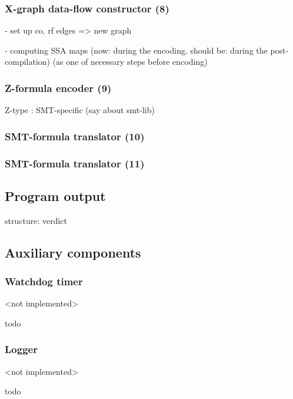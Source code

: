 \subsubsection{X-graph data-flow constructor (8)}
\label{ch:impl:proc:x-df}%

- set up co, rf edges => new graph

- computing SSA maps (now: during the encoding. should be: during the post-compilation) (as one of necessary steps before encoding)


\subsubsection{Z-formula encoder (9)}
\label{ch:impl:proc:z-encoder}

Z-type : SMT-specific (say about smt-lib)


\subsubsection{SMT-formula translator (10)}
\label{ch:impl:proc:smt-transator}%


\subsubsection{SMT-formula translator (11)}
\label{ch:impl:proc:smt-solver}%



\subsection{Program output}
\label{ch:impl:out}

structure: verdict




\subsection{Auxiliary components}
\label{ch:impl:aux}

\subsubsection{Watchdog timer}
\label{ch:impl:aux:watchdog}

<not implemented>

todo

\subsubsection{Logger}
\label{ch:impl:aux:logger}

<not implemented>

todo





